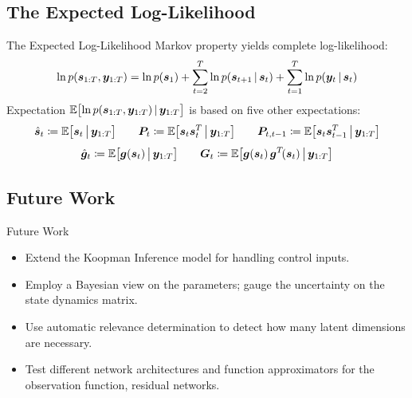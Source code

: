 \documentclass[
	aspectratio=43,
	color={accentcolor=1c},
	logo=false,
	colorframetitle=true,
]{tudabeamer}
\begin{document}
		\subsection{The Expected Log-Likelihood}
			\begin{frame}{The Expected Log-Likelihood}
				Markov property yields complete log-likelihood:
				\begin{align*}
					\ln p(\bm{s}_{1:T}, \bm{y}_{1:T}) = \ln p(\bm{s}_1) + \sum_{t = 2}^{T} \ln p(\bm{s}_{t + 1} \,\vert\, \bm{s}_t) + \sum_{t = 1}^{T} \ln p(\bm{y}_t \,\vert\, \bm{s}_t)
				\end{align*}
				Expectation \( \mathbb{E}\big[\! \ln p(\bm{s}_{1:T}, \bm{y}_{1:T}) \,\vert\, \bm{y}_{1:T} \big] \) is based on five other expectations:
				\begin{align*}
					\hat{\bm{s}}_t \coloneqq \mathbb{E}\big[ \bm{s}_t \,\big\vert\, \bm{y}_{1:T} \big]
					\qquad
					\bm{P}_t \coloneqq \mathbb{E}\big[ \bm{s}_t \bm{s}_t^T \,\big\vert\, \bm{y}_{1:T} \big]
					\qquad
					\bm{P}_{t, t - 1} \coloneqq \mathbb{E}\big[ \bm{s}_t \bm{s}_{t - 1}^T \,\big\vert\, \bm{y}_{1:T} \big]
				\end{align*}
				\begin{align*}
					\hat{\bm{g}}_t \coloneqq \mathbb{E}\big[ \bm{g}(\bm{s}_t) \,\big\vert\, \bm{y}_{1:T} \big]
					\qquad
					\bm{G}_t \coloneqq \mathbb{E}\big[ \bm{g}(\bm{s}_t) \, \bm{g}^T\!(\bm{s}_t) \,\big\vert\, \bm{y}_{1:T} \big]
				\end{align*}
			\end{frame}

		\subsection{Future Work}
			\begin{frame}{Future Work}
				\begin{itemize}
					\item Extend the Koopman Inference model for handling control inputs.
					\item Employ a Bayesian view on the parameters; gauge the uncertainty on \eg the state dynamics matrix.
					\item Use automatic relevance determination to detect how many latent dimensions are necessary.
					\item Test different network architectures and function approximators for the observation function, \eg residual networks.
				\end{itemize}
			\end{frame}
\end{document}
